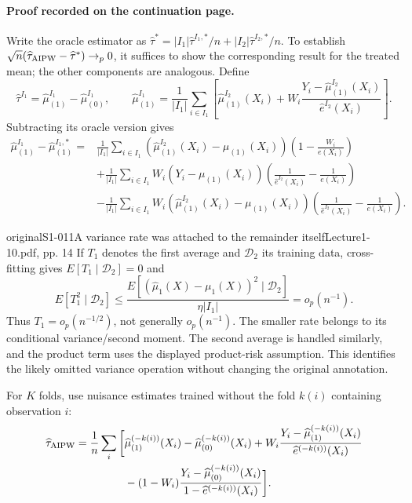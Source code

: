 \paragraph{Proof recorded on the continuation page.}
Write the oracle estimator as
$\widehat\tau^*=|I_1|\widehat\tau^{I_1,*}/n+|I_2|\widehat\tau^{I_2,*}/n$.
To establish $\sqrt n(\widehat\tau_{\rm AIPW}-\widehat\tau^*)\to_p0$, it suffices to show the corresponding result for the treated mean; the other components are analogous. Define
\[
\widehat\tau^{I_1}=\widehat\mu^{I_1}_{(1)}-\widehat\mu^{I_1}_{(0)},\qquad
\widehat\mu^{I_1}_{(1)}=\frac1{|I_1|}\sum_{i\in I_1}
\left[\widehat\mu^{I_2}_{(1)}(X_i)+W_i\frac{Y_i-\widehat\mu^{I_2}_{(1)}(X_i)}{\widehat e^{I_2}(X_i)}\right].
\]
Subtracting its oracle version gives
\begin{align*}
\widehat\mu^{I_1}_{(1)}-\widehat\mu^{I_1,*}_{(1)}
={}&\frac1{|I_1|}\sum_{i\in I_1}
(\widehat\mu^{I_2}_{(1)}(X_i)-\mu_{(1)}(X_i))\left(1-\frac{W_i}{e(X_i)}\right)\\
&+\frac1{|I_1|}\sum_{i\in I_1}W_i(Y_i-\mu_{(1)}(X_i))
\left(\frac1{\widehat e^{I_2}(X_i)}-\frac1{e(X_i)}\right)\\
&-\frac1{|I_1|}\sum_{i\in I_1}W_i(\widehat\mu^{I_2}_{(1)}(X_i)-\mu_{(1)}(X_i))
\left(\frac1{\widehat e^{I_2}(X_i)}-\frac1{e(X_i)}\right).
\end{align*}
\begin{reviewnote}{original}{S1-011}{A variance rate was attached to the remainder itself}{Lecture1-10.pdf, pp. 14}
If $T_1$ denotes the first average and $\mathcal D_2$ its training data, cross-fitting gives $E[T_1\mid\mathcal D_2]=0$ and
\[
E[T_1^2\mid\mathcal D_2]
\le \frac{E[(\widehat\mu_1(X)-\mu_1(X))^2\mid\mathcal D_2]}{\eta|I_1|}
=o_p(n^{-1}).
\]
Thus $T_1=o_p(n^{-1/2})$, not generally $o_p(n^{-1})$. The smaller rate belongs to its conditional variance/second moment. The second average is handled similarly, and the product term uses the displayed product-risk assumption. This identifies the likely omitted variance operation without changing the original annotation.
\end{reviewnote}


For $K$ folds, use nuisance estimates trained without the fold $k(i)$ containing observation $i$:
\begin{align*}
\widehat\tau_{\rm AIPW}=\frac1n\sum_i\bigg[&\widehat\mu_{(1)}^{(-k(i))}(X_i)-\widehat\mu_{(0)}^{(-k(i))}(X_i)
+W_i\frac{Y_i-\widehat\mu_{(1)}^{(-k(i))}(X_i)}{\widehat e^{(-k(i))}(X_i)}\\
&-(1-W_i)\frac{Y_i-\widehat\mu_{(0)}^{(-k(i))}(X_i)}{1-\widehat e^{(-k(i))}(X_i)}\bigg].
\end{align*}
